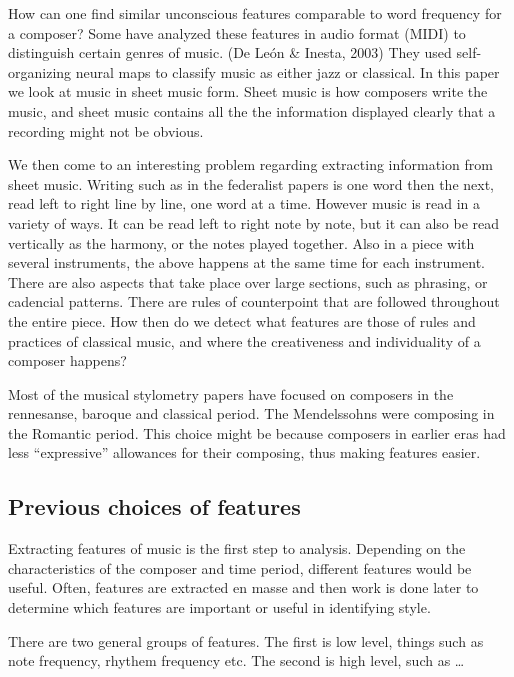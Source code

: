 \documentclass[12pt,twoside]{reedthesis}
\theoremstyle{definition}
\theoremstyle{definition}
\theoremstyle{definition}
\theoremstyle{remark}
\begin{document}
How can one find similar unconscious features comparable to word
frequency for a composer? Some have analyzed these features in audio
format (MIDI) to distinguish certain genres of music. (De León \&
Inesta, 2003) They used self-organizing neural maps to classify music as
either jazz or classical. In this paper we look at music in sheet music
form. Sheet music is how composers write the music, and sheet music
contains all the the information displayed clearly that a recording
might not be obvious.

We then come to an interesting problem regarding extracting information
from sheet music. Writing such as in the federalist papers is one word
then the next, read left to right line by line, one word at a time.
However music is read in a variety of ways. It can be read left to right
note by note, but it can also be read vertically as the harmony, or the
notes played together. Also in a piece with several instruments, the
above happens at the same time for each instrument. There are also
aspects that take place over large sections, such as phrasing, or
cadencial patterns. There are rules of counterpoint that are followed
throughout the entire piece. How then do we detect what features are
those of rules and practices of classical music, and where the
creativeness and individuality of a composer happens?

Most of the musical stylometry papers have focused on composers in the
rennesanse, baroque and classical period. The Mendelssohns were
composing in the Romantic period. This choice might be because composers
in earlier eras had less ``expressive'' allowances for their composing,
thus making features easier.

\subsection{Previous choices of
features}\label{previous-choices-of-features}

Extracting features of music is the first step to analysis. Depending on
the characteristics of the composer and time period, different features
would be useful. Often, features are extracted en masse and then work is
done later to determine which features are important or useful in
identifying style.

There are two general groups of features. The first is low level, things
such as note frequency, rhythem frequency etc. The second is high level,
such as \ldots{}
\end{document}
